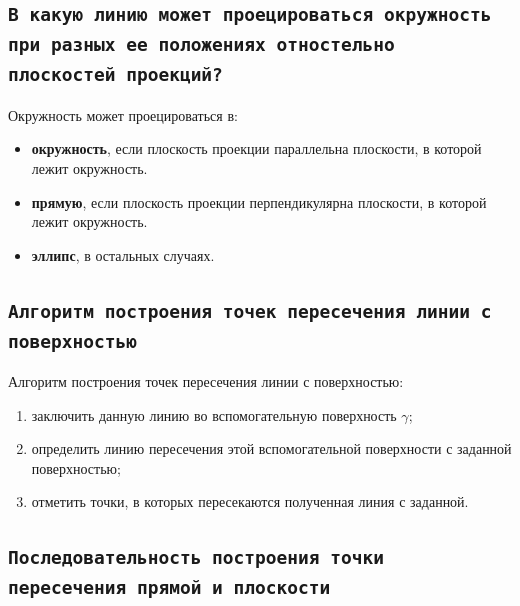 
\newpage
\subsection{\texttt{В какую линию может проецироваться окружность при разных ее положениях отностельно плоскостей проекций?}}

\begin{myquote}
\end{myquote}
Окружность может проецироваться в:
\begin{itemize}
    \item {\bf окружность}, если плоскость проекции параллельна плоскости, в которой лежит окружность.
    \item {\bf прямую}, если плоскость проекции перпендикулярна плоскости, в которой лежит окружность.
    \item {\bf эллипс}, в остальных случаях.
\end{itemize}



\newpage
\subsection{\texttt{Алгоритм построения точек пересечения линии с поверхностью}}
\begin{myquote}
\end{myquote}
Алгоритм построения точек пересечения линии с поверхностью:
\begin{enumerate}
    \item заключить данную линию во вспомогательную поверхность $\gamma$;
    \item определить линию пересечения этой вспомогательной поверхности с заданной поверхностью;
    \item отметить точки, в которых пересекаются полученная линия с заданной.
\end{enumerate}


\newpage
\subsection{\texttt{Последовательность построения точки пересечения прямой и плоскости}}
\begin{myquote}
\end{myquote}


